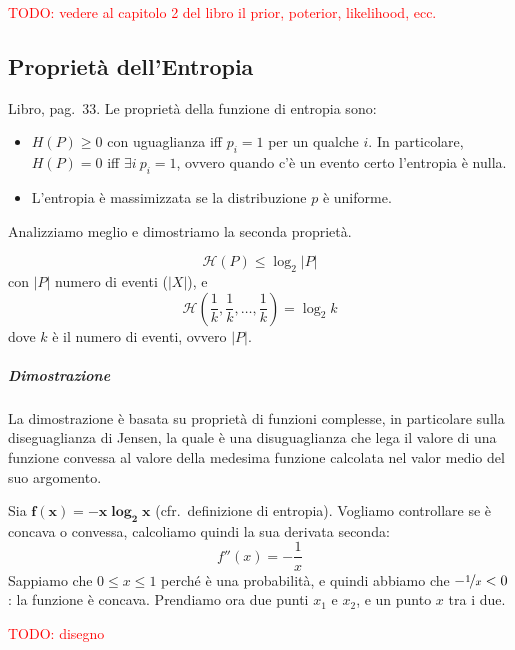 \textcolor{Red}{TODO: vedere al capitolo 2 del libro il prior, poterior, likelihood, ecc.}



\subsection{Proprietà dell'Entropia}
Libro, pag.~33. Le proprietà della funzione di entropia sono:
\begin{itemize}
    \item $H(P)\geq 0$ con uguaglianza iff $p_i=1$ per un qualche $i$. In particolare, $H(P)=0$ iff $\exists i ~p_i=1$, ovvero quando c'è un evento certo l'entropia è nulla.
    \item L'entropia è massimizzata se la distribuzione $p$ è uniforme.
\end{itemize}
Analizziamo meglio e dimostriamo la seconda proprietà.

\begin{property} 
    $$
        \mathcal{H}(P)\leq \log_2|P|
    $$
    con $|P|$ numero di eventi ($|X|$), e
    $$
        \mathcal{H}\left(\frac{1}{k},\frac{1}{k},\dots,\frac{1}{k}\right) = \log_2 k
    $$
    dove $k$ è il numero di eventi, ovvero $|P|$.
\end{property}

\subparagraph{Dimostrazione} La dimostrazione è basata su proprietà di funzioni complesse, in particolare sulla diseguaglianza di Jensen, la quale è una disuguaglianza che lega il valore di una funzione convessa al valore della medesima funzione calcolata nel valor medio del suo argomento.

Sia $\bm{f(x)=-x\log_2x}$ (cfr.~definizione di entropia). Vogliamo controllare se è concava o convessa, calcoliamo quindi la sua derivata seconda:
$$
    f''(x) = -\frac{1}{x}
$$
Sappiamo che $0\leq x\leq 1$ perché è una probabilità, e quindi abbiamo che $-\nicefrac{1}{x}<0$: la funzione è con\-ca\-va. Prendiamo ora due punti $x_1$ e $x_2$, e un punto $x$ tra i due.

\textcolor{Red}{TODO: disegno}


